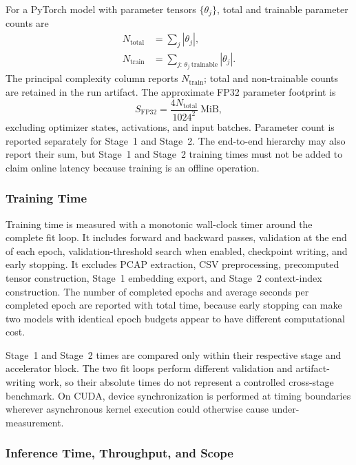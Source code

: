 For a PyTorch model with parameter tensors $\{\theta_j\}$, total and trainable
parameter counts are
\begin{align}
    N_{\mathrm{total}} &= \sum_j |\theta_j|, \\
    N_{\mathrm{train}} &= \sum_{j:\,\theta_j\ \mathrm{trainable}}|\theta_j|.
    \label{eq:parameter_counts}
\end{align}
The principal complexity column reports $N_{\mathrm{train}}$; total and
non-trainable counts are retained in the run artifact. The approximate FP32
parameter footprint is
\begin{equation}
    S_{\mathrm{FP32}}=\frac{4N_{\mathrm{total}}}{1024^2}\ \mathrm{MiB},
    \label{eq:fp32_model_size}
\end{equation}
excluding optimizer states, activations, and input batches. Parameter count is
reported separately for Stage~1 and Stage~2. The end-to-end hierarchy may also
report their sum, but Stage~1 and Stage~2 training times must not be added to
claim online latency because training is an offline operation.

\subsubsection{Training Time}
\label{subsubsec:training_time_measurement}

Training time is measured with a monotonic wall-clock timer around the complete
fit loop. It includes forward and backward passes, validation at the end of
each epoch, validation-threshold search when enabled, checkpoint writing, and
early stopping. It excludes PCAP extraction, CSV preprocessing, precomputed
tensor construction, Stage~1 embedding export, and Stage~2 context-index
construction. The number of completed epochs and average seconds per completed
epoch are reported with total time, because early stopping can make two models
with identical epoch budgets appear to have different computational cost.

Stage~1 and Stage~2 times are compared only within their respective stage and
accelerator block. The
two fit loops perform different validation and artifact-writing work, so their
absolute times do not represent a controlled cross-stage benchmark. On CUDA,
device synchronization is performed at timing boundaries wherever asynchronous
kernel execution could otherwise cause under-measurement.

\subsubsection{Inference Time, Throughput, and Scope}
\label{subsubsec:inference_time_measurement}

